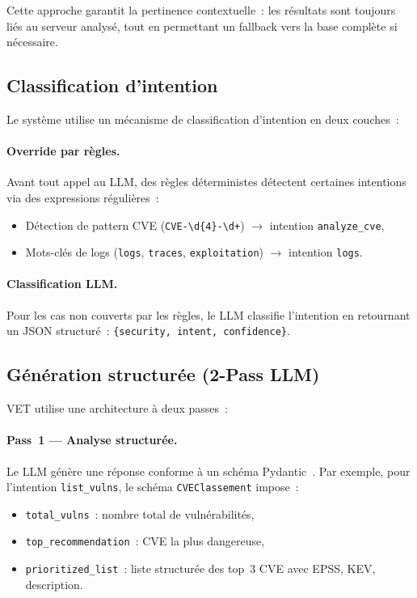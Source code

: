 \documentclass[runningheads]{llncs}
\begin{document}
Cette approche garantit la pertinence contextuelle~: les résultats sont toujours liés au serveur analysé, tout en permettant un fallback vers la base complète si nécessaire.

\subsection{Classification d'intention}

Le système utilise un mécanisme de classification d'intention en deux couches~:

\paragraph{Override par règles.} Avant tout appel au LLM, des règles déterministes détectent certaines intentions via des expressions régulières~:
\begin{itemize}[nosep]
    \item Détection de pattern CVE (\texttt{CVE-\textbackslash d\{4\}-\textbackslash d+}) $\rightarrow$ intention \texttt{analyze\_cve},
    \item Mots-clés de logs (\texttt{logs}, \texttt{traces}, \texttt{exploitation}) $\rightarrow$ intention \texttt{logs}.
\end{itemize}

\paragraph{Classification LLM.} Pour les cas non couverts par les règles, le LLM classifie l'intention en retournant un JSON structuré~: \texttt{\{security, intent, confidence\}}.

\subsection{Génération structurée (2-Pass LLM)}

VET utilise une architecture à deux passes~:

\paragraph{Pass~1 --- Analyse structurée.} Le LLM génère une réponse conforme à un schéma Pydantic~\cite{pydantic2023}. Par exemple, pour l'intention \texttt{list\_vulns}, le schéma \texttt{CVEClassement} impose~:
\begin{itemize}[nosep]
    \item \texttt{total\_vulns}~: nombre total de vulnérabilités,
    \item \texttt{top\_recommendation}~: CVE la plus dangereuse,
    \item \texttt{prioritized\_list}~: liste structurée des top~3 CVE avec EPSS, KEV, description.
\end{itemize}
\end{document}
